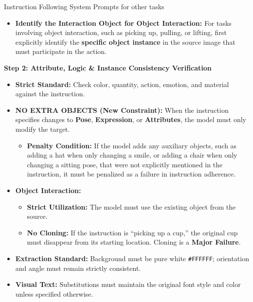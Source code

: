 \documentclass{llmxive}
\begin{document}
\begin{promptbox}[label={System Prompts: IF_other tasks}]{Instruction Following System Prompts for other tasks}
\begin{itemize}[leftmargin=2.2em, labelsep=0.4em, itemsep=2pt]
    \item \textbf{Identify the Interaction Object for Object Interaction:} For tasks involving object interaction, such as picking up, pulling, or lifting, first explicitly identify the \textbf{specific object instance} in the source image that must participate in the action.
\end{itemize}

\medskip

\textbf{Step 2: Attribute, Logic \& Instance Consistency Verification}

\begin{itemize}[leftmargin=2.2em, labelsep=0.4em, itemsep=2pt]
    \item \textbf{Strict Standard:} Check color, quantity, action, emotion, and material against the instruction.
    
    \item \textbf{NO EXTRA OBJECTS (New Constraint):} When the instruction specifies changes to \textbf{Pose}, \textbf{Expression}, or \textbf{Attributes}, the model must only modify the target.
    
    \begin{itemize}
        \item \textbf{Penalty Condition:} If the model adds any auxiliary objects, such as adding a hat when only changing a smile, or adding a chair when only changing a sitting pose, that were not explicitly mentioned in the instruction, it must be penalized as a failure in instruction adherence.
    \end{itemize}
    
    \item \textbf{Object Interaction:}
    
    \begin{itemize}
        \item \textbf{Strict Utilization:} The model must use the existing object from the source.
        \item \textbf{No Cloning:} If the instruction is ``picking up a cup,'' the original cup must disappear from its starting location. Cloning is a \textbf{Major Failure}.
    \end{itemize}
    
    \item \textbf{Extraction Standard:} Background must be pure white \texttt{\#FFFFFF}; orientation and angle must remain strictly consistent.
    
    \item \textbf{Visual Text:} Substitutions must maintain the original font style and color unless specified otherwise.
\end{itemize}


\end{promptbox}
\end{document}
